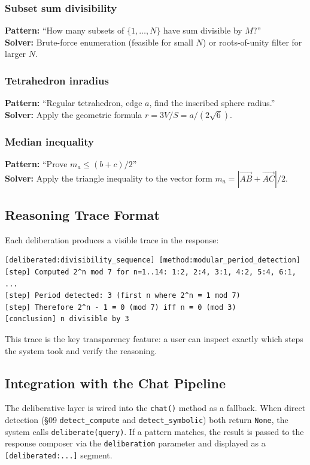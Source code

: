 \documentclass[11pt,a4paper]{article}
\begin{document}
\subsubsection{Subset sum divisibility}
\textbf{Pattern:} ``How many subsets of $\{1, \ldots, N\}$ have sum divisible by $M$?'' \\
\textbf{Solver:} Brute-force enumeration (feasible for small $N$) or roots-of-unity filter for larger $N$.

\subsubsection{Tetrahedron inradius}
\textbf{Pattern:} ``Regular tetrahedron, edge $a$, find the inscribed sphere radius.'' \\
\textbf{Solver:} Apply the geometric formula $r = 3V/S = a/(2\sqrt{6})$.

\subsubsection{Median inequality}
\textbf{Pattern:} ``Prove $m_a \leq (b+c)/2$'' \\
\textbf{Solver:} Apply the triangle inequality to the vector form $m_a = |\vec{AB} + \vec{AC}|/2$.

\subsection{Reasoning Trace Format}

Each deliberation produces a visible trace in the response:

\begin{verbatim}
[deliberated:divisibility_sequence] [method:modular_period_detection]
[step] Computed 2^n mod 7 for n=1..14: 1:2, 2:4, 3:1, 4:2, 5:4, 6:1, ...
[step] Period detected: 3 (first n where 2^n ≡ 1 mod 7)
[step] Therefore 2^n - 1 ≡ 0 (mod 7) iff n ≡ 0 (mod 3)
[conclusion] n divisible by 3
\end{verbatim}

This trace is the key transparency feature: a user can inspect exactly which steps the system took and verify the reasoning.

\subsection{Integration with the Chat Pipeline}

The deliberative layer is wired into the \texttt{chat()} method as a fallback. When direct detection (\S09 \texttt{detect\_compute} and \texttt{detect\_symbolic}) both return \texttt{None}, the system calls \texttt{deliberate(query)}. If a pattern matches, the result is passed to the response composer via the \texttt{deliberation} parameter and displayed as a \texttt{[deliberated:...]} segment.
\end{document}
